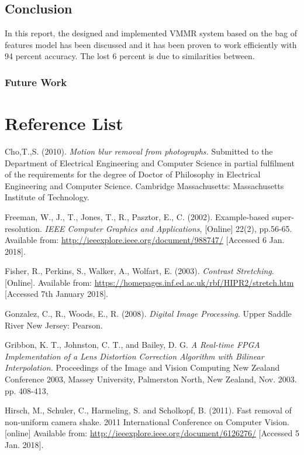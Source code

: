 \documentclass[a4paper, 12pt]{article}
\begin{document}
\subsection{Conclusion}
In this report, the designed and implemented VMMR system based on the bag of features model has been discussed and it has been proven to work efficiently with 94 percent accuracy. The lost 6 percent is due to similarities between. 

\subsubsection{Future Work}

\newpage
\section{Reference List} 

Cho,T.,S. (2010). \textit{Motion blur removal from photographs.} Submitted to the Department of Electrical Engineering and Computer Science in partial fulfilment of the requirements for the degree of Doctor of Philosophy in Electrical Engineering and Computer Science. Cambridge Massachusetts: Massachusetts Institute of Technology.
 
Freeman, W., J., T., Jones, T., R.,  Pasztor, E., C. (2002). Example-based super-resolution. \textit{IEEE Computer Graphics and Applications}, [Online] 22(2), pp.56-65. Available from: \url{http://ieeexplore.ieee.org/document/988747/} [Accessed 6 Jan. 2018].

Fisher, R., Perkins, S., Walker, A., Wolfart, E. (2003). \textit{Contrast Stretching}. [Online]. Available from: \url{https://homepages.inf.ed.ac.uk/rbf/HIPR2/stretch.htm} [Accessed 7th January 2018].

Gonzalez, C., R., Woods, E., R. (2008). \textit{Digital Image Processing.} Upper Saddle River New Jersey: Pearson.

Gribbon, K. T., Johnston, C. T., and Bailey, D.
G. \textit{A Real-time FPGA Implementation of a
Lens Distortion Correction Algorithm with
Bilinear Interpolation.} Proceedings of the
Image and Vision Computing New Zealand
Conference 2003, Massey University,
Palmerston North, New Zealand, Nov. 2003. pp. 408-413,

Hirsch, M., Schuler, C., Harmeling, S. and Scholkopf, B. (2011). Fast removal of non-uniform camera shake. 2011 International Conference on Computer Vision. [online] Available from: \url{http://ieeexplore.ieee.org/document/6126276/} [Accessed 5 Jan. 2018].
\end{document}
